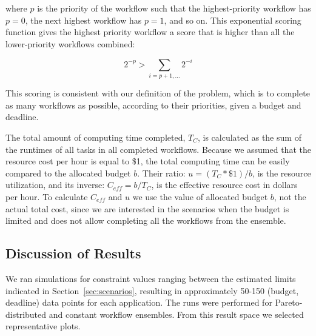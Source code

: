 \documentclass{sig-alternate}
\begin{document}
where $p$ is the priority of the workflow such that the highest-priority workflow 
has $p=0$, the next highest workflow has $p=1$, and so on. This exponential scoring 
function gives the highest priority workflow a score that is higher than all the 
lower-priority workflows combined:

\begin{equation}
\label{eq:score-property}
2^{-p} > \sum_{i=p+1,\ldots}2^{-i}
\end{equation}

This scoring is consistent with our definition of the problem, which is to 
complete as many workflows as possible, according to their priorities, given 
a budget and deadline.

The total amount of computing time completed, $T_C$, is calculated as the sum 
of the runtimes of all tasks in all completed workflows. Because we assumed 
that the resource cost per hour is equal to \$1, the total computing time 
can be easily compared to the allocated budget $b$. Their ratio: 
$u = (T_C * \$1)/b$, is the resource utilization, and its inverse: 
$C_{eff} = b/T_C$, is the effective resource cost in dollars per hour. To
calculate $C_{eff}$ and $u$ we use the value of allocated budget $b$, not the
actual total cost, since we are interested in the scenarios when the budget is
limited and does not allow completing all the workflows from the ensemble.



\subsection{Discussion of Results}

We ran simulations for constraint values ranging between the estimated 
limits indicated in Section~\ref{sec:scenarios}, resulting in approximately 
50-150 (budget, deadline) data points for each application. The runs were
performed for Pareto-distributed and constant workflow ensembles. From this result
space we selected representative plots. 
\end{document}

